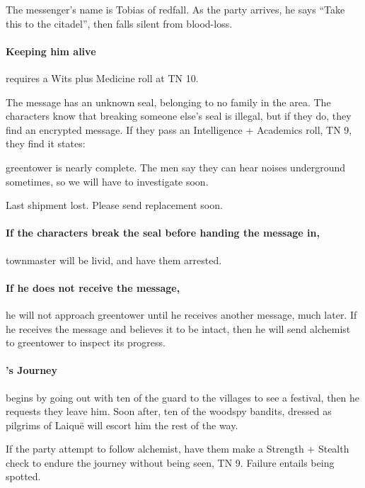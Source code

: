 \begin{multicols}{2}
\begin{boxtext}
\end{boxtext}

The messenger's name is Tobias of \gls{redfall}.
As the party arrives, he says ``Take this to the citadel'', then falls silent from blood-loss.

\paragraph{Keeping him alive}
requires a Wits plus Medicine roll at TN 10.

The message has an unknown seal, belonging to no family in the area.
The characters know that breaking someone else's seal is illegal, but if they do, they find an encrypted message.
If they pass an Intelligence + Academics roll, TN 9, they find it states:

\begin{speechtext}

  \Gls{greentower} is nearly complete.
  The men say they can hear noises underground sometimes, so we will have to investigate soon.

  Last shipment lost.
  Please send replacement soon.

\end{speechtext}

\paragraph{If the characters break the seal before handing the message in,} \gls{townmaster} will be livid, and have them arrested.

\paragraph{If he does not receive the message,}
he will not approach \gls{greentower} until he receives another message, much later.
If he receives the message and believes it to be intact, then he will send \gls{alchemist} to \gls{greentower} to inspect its progress.

\paragraph{'s Journey}
begins by going out with ten of the \gls{guard} to the villages to see a festival, then he requests they leave him.
Soon after, ten of the woodspy bandits, dressed as pilgrims of Laiqu\"e will escort him the rest of the way.

If the party attempt to follow \gls{alchemist}, have them make a Strength + Stealth check to endure the journey without being seen, TN 9.
Failure entails being spotted.


\end{multicols}
